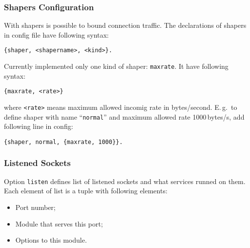 \documentclass[10pt]{article}
\begin{document}
\subsubsection{Shapers Configuration}
\label{sec:configshaper}

With shapers is possible to bound connection traffic.  The declarations of
shapers in config file have following syntax:
\begin{verbatim}
{shaper, <shapername>, <kind>}.
\end{verbatim}
Currently implemented only one kind of shaper: \texttt{maxrate}.  It have
following syntax:
\begin{verbatim}
{maxrate, <rate>}
\end{verbatim}
where \texttt{<rate>} means maximum allowed incomig rate in bytes/second.
E.\,g.\ to define shaper with name ``\texttt{normal}'' and maximum allowed rate
1000\,bytes/s, add following line in config:
\begin{verbatim}
{shaper, normal, {maxrate, 1000}}.
\end{verbatim}




\subsubsection{Listened Sockets}
\label{sec:configlistened}

Option \texttt{listen} defines list of listened sockets and what services
runned on them.  Each element of list is a tuple with following elements:
\begin{itemize}
\item Port number;
\item Module that serves this port;
\item Options to this module.
\end{itemize}
\end{document}
